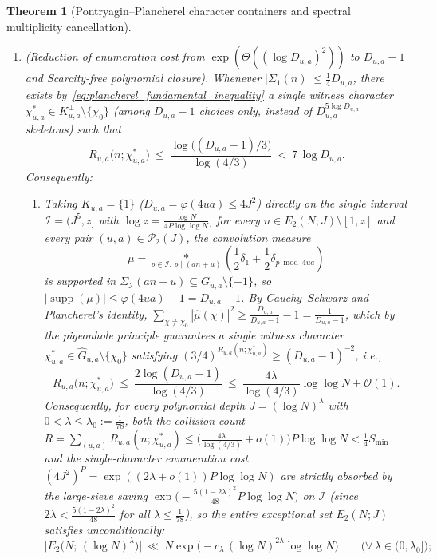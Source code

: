 \documentclass[11pt, a4paper]{article}
\theoremstyle{plain}
\newtheorem{theorem}{Theorem}[section]
\theoremstyle{definition}
\begin{document}
\begin{theorem}[Pontryagin--Plancherel character containers and spectral multiplicity cancellation]
\begin{enumerate}[label=(\alph*)]
    \item \emph{(Reduction of enumeration cost from $\exp(\Theta((\log D_{u,a})^{2}))$ to $D_{u,a}-1$ and Scarcity-free polynomial closure).} 
    Whenever $\big|\overline{\Sigma}_1(n)\big|\le\frac14 D_{u,a}$, there exists by~\eqref{eq:plancherel_fundamental_inequality} a \emph{single witness character} $\chi_{u,a}^{\ast}\in K_{u,a}^{\perp}\setminus\{\chi_0\}$ (among $D_{u,a}-1$ choices only, instead of $D_{u,a}^{5\log D_{u,a}}$ skeletons) such that
    \begin{equation}\label{eq:single_character_collision_bound}
    R_{u,a}\big(n;\chi_{u,a}^{\ast}\big)\ \le\ \frac{\log\big((D_{u,a}-1)/3\big)}{\log(4/3)}\ <\ 7\,\log D_{u,a}.
    \end{equation}
    Consequently:
    \begin{enumerate}[label=(\roman*)]
        \item Taking $K_{u,a}=\{1\}$ ($D_{u,a}=\varphi(4ua)\le 4J^{2}$) directly on the single interval $\mathcal{I}=(J^{5},z]$ with $\log z=\frac{\log N}{4P\log\log N}$, for every $n\in E_2(N;J)\setminus[1,z]$ and every pair $(u,a)\in\mathcal{P}_2(J)$, the convolution measure 
        \[
        \mu=\operatorname*{\ast}_{p\in\mathcal{I},\,p\mid(an+u)}\left(\frac12\delta_1+\frac12\delta_{p\bmod 4ua}\right)
        \]
        is supported in $\Sigma_{\mathcal{I}}(an+u)\subseteq G_{u,a}\setminus\{-1\}$, so $|\operatorname{supp}(\mu)|\le\varphi(4ua)-1=D_{u,a}-1$. By Cauchy--Schwarz and Plancherel's identity, $\sum_{\chi\neq\chi_0}|\widehat{\mu}(\chi)|^{2}\ge\frac{D_{u,a}}{D_{u,a}-1}-1=\frac{1}{D_{u,a}-1}$, which by the pigeonhole principle guarantees a single witness character $\chi_{u,a}^{\ast}\in\widehat{G}_{u,a}\setminus\{\chi_0\}$ satisfying $(3/4)^{R_{u,a}(n;\chi_{u,a}^{\ast})}\ge(D_{u,a}-1)^{-2}$, i.e.,
        \[
        R_{u,a}\big(n;\chi_{u,a}^{\ast}\big)\ \le\ \frac{2\log(D_{u,a}-1)}{\log(4/3)}\ \le\ \frac{4\lambda}{\log(4/3)}\log\log N+\mathcal{O}(1).
        \]
        Consequently, for every polynomial depth $J=(\log N)^{\lambda}$ with $0<\lambda\le\lambda_0:=\frac{1}{78}$, both the collision count $R=\sum_{(u,a)}R_{u,a}(n;\chi_{u,a}^{\ast})\le\big(\frac{4\lambda}{\log(4/3)}+o(1)\big)P\log\log N<\frac14 S_{\min}$ and the single-character enumeration cost $(4J^{2})^{P}=\exp((2\lambda+o(1))P\log\log N)$ are strictly absorbed by the large-sieve saving $\exp\big(-\frac{5(1-2\lambda)^{2}}{48}P\log\log N\big)$ on $\mathcal{I}$ (since $2\lambda<\frac{5(1-2\lambda)^{2}}{48}$ for all $\lambda\le\frac{1}{78}$), so the \emph{entire} exceptional set $E_2(N;J)$ satisfies unconditionally:
        \begin{equation}\label{eq:unconditional_polynomial_depth_full_E2}
        \big|E_2\big(N;\,(\log N)^{\lambda}\big)\big|\ \ll\ N\exp\!\Big(-c_\lambda\,(\log N)^{2\lambda}\log\log N\Big)\qquad\big(\forall\,\lambda\in(0,\lambda_0]\big);
        \end{equation}
        

\end{enumerate}
\end{enumerate}
\end{theorem}
\end{document}
